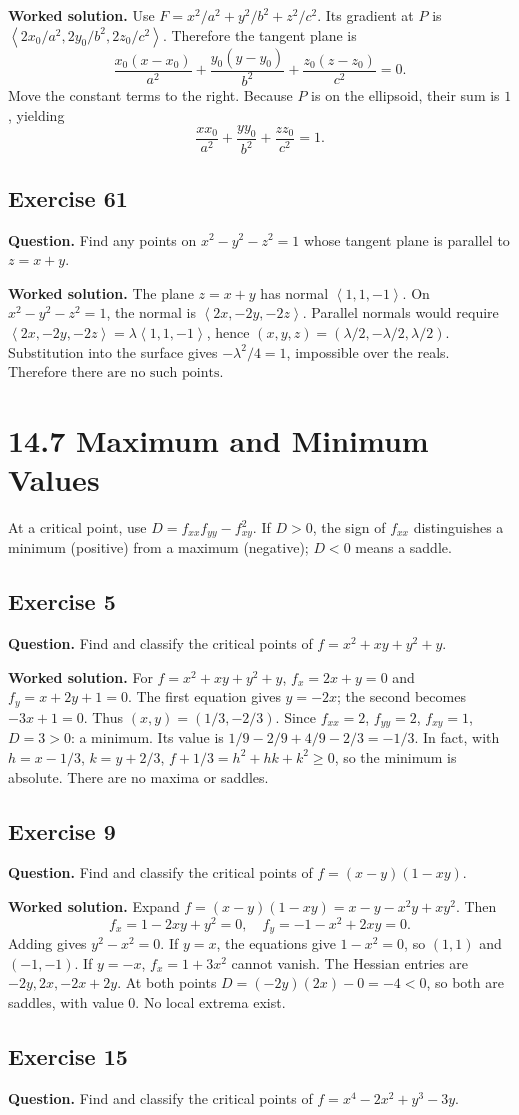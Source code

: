 \documentclass[11pt]{article}
\newcommand{\ex}[1]{\Needspace{8\baselineskip}\subsection*{Exercise #1}}
\newcommand{\ans}[1]{\boxed{#1}}
\newcommand{\vv}[1]{\left\langle #1\right\rangle}
\begin{document}
\textbf{Worked solution.}
Use $F=x^2/a^2+y^2/b^2+z^2/c^2$. Its gradient at $P$ is $\vv{2x_0/a^2,2y_0/b^2,2z_0/c^2}$. Therefore the tangent plane is
\[\frac{x_0(x-x_0)}{a^2}+\frac{y_0(y-y_0)}{b^2}+\frac{z_0(z-z_0)}{c^2}=0.\]
Move the constant terms to the right. Because $P$ is on the ellipsoid, their sum is $1$, yielding
\[\ans{\frac{xx_0}{a^2}+\frac{yy_0}{b^2}+\frac{zz_0}{c^2}=1}.\]
\ex{61}
\textbf{Question.} Find any points on $x^2-y^2-z^2=1$ whose tangent plane is parallel to $z=x+y$.

\textbf{Worked solution.}
The plane $z=x+y$ has normal $\vv{1,1,-1}$. On $x^2-y^2-z^2=1$, the normal is $\vv{2x,-2y,-2z}$. Parallel normals would require $\vv{2x,-2y,-2z}=\lambda\vv{1,1,-1}$, hence $(x,y,z)=(\lambda/2,-\lambda/2,\lambda/2)$. Substitution into the surface gives $-\lambda^2/4=1$, impossible over the reals. Therefore $\ans{\text{there are no such points}}$.
\clearpage\section*{14.7 Maximum and Minimum Values}
\noindent At a critical point, use $D=f_{xx}f_{yy}-f_{xy}^2$. If $D>0$, the sign of $f_{xx}$ distinguishes a minimum (positive) from a maximum (negative); $D<0$ means a saddle.
\ex{5}
\textbf{Question.} Find and classify the critical points of $f=x^2+xy+y^2+y$.

\textbf{Worked solution.}
For $f=x^2+xy+y^2+y$, $f_x=2x+y=0$ and $f_y=x+2y+1=0$. The first equation gives $y=-2x$; the second becomes $-3x+1=0$. Thus $(x,y)=(1/3,-2/3)$. Since $f_{xx}=2$, $f_{yy}=2$, $f_{xy}=1$, $D=3>0$: a minimum. Its value is $1/9-2/9+4/9-2/3=\ans{-1/3}$. In fact, with $h=x-1/3$, $k=y+2/3$, $f+1/3=h^2+hk+k^2\ge0$, so the minimum is absolute. There are no maxima or saddles.
\ex{9}
\textbf{Question.} Find and classify the critical points of $f=(x-y)(1-xy)$.

\textbf{Worked solution.}
Expand $f=(x-y)(1-xy)=x-y-x^2y+xy^2$. Then
\[f_x=1-2xy+y^2=0,\quad f_y=-1-x^2+2xy=0.\]
Adding gives $y^2-x^2=0$. If $y=x$, the equations give $1-x^2=0$, so $(1,1)$ and $(-1,-1)$. If $y=-x$, $f_x=1+3x^2$ cannot vanish. The Hessian entries are $-2y,2x,-2x+2y$. At both points $D=(-2y)(2x)-0=-4<0$, so both are saddles, with value $0$. No local extrema exist.
\ex{15}
\textbf{Question.} Find and classify the critical points of $f=x^4-2x^2+y^3-3y$.
\end{document}
